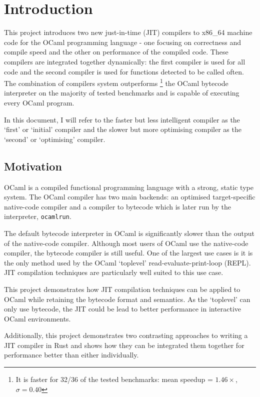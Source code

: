 \chapter{Introduction}

This project introduces two new just-in-time (JIT) compilers to x86\_64 machine code for the OCaml
programming language - one focusing on correctness and compile speed and the other on performance
of the compiled code. These compilers are integrated together dynamically: the first compiler is
used for all code and the second compiler is used for functions detected to be called often.  The
combination of compilers system outperforms
\footnote{It is faster for 32/36 of the tested benchmarks: mean speedup = $1.46\times$, $\sigma =
            0.40$}
the
OCaml bytecode interpreter on the majority of tested benchmarks and is capable of executing every
OCaml program.

In this document, I will refer to the faster but less intelligent compiler as the `first' or
`initial' compiler and the slower but more optimising compiler as the `second' or `optimising'
compiler.

\section{Motivation}

OCaml is a compiled functional programming language with a strong, static type system. The OCaml
compiler has two main backends: an optimised target-specific native-code compiler and a compiler to
bytecode which is later run by the interpreter, \texttt{ocamlrun}.

The default bytecode interpreter in OCaml is significantly slower than the output of the
native-code compiler. Although most users of OCaml use the native-code compiler, the bytecode
compiler is
still useful. One of the largest use cases is it is the only method used by the OCaml `toplevel'
read-evaluate-print-loop (REPL). JIT compilation techniques are particularly well suited to this
use case.

This project demonstrates how JIT compilation techniques can be applied to OCaml while retaining
the bytecode format and semantics. As the `toplevel' can only use
bytecode, the JIT could be lead to better performance in interactive OCaml environments.

Additionally, this project demonstrates two contrasting approaches to writing a JIT compiler in
Rust and shows how they can be integrated them together for performance better than either
individually.


